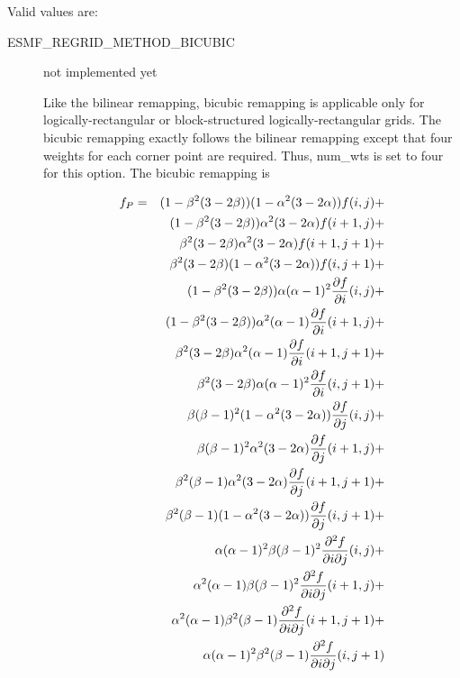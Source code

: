 Valid values are:
\begin{description}
\item[ESMF\_REGRID\_METHOD\_BICUBIC ] not implemented yet

     Like the bilinear remapping, bicubic remapping is applicable
     only for logically-rectangular or block-structured logically-rectangular
     grids.  The bicubic remapping exactly follows the bilinear remapping except
     that four weights for each corner point are required.  Thus, num\_wts
     is set to four for this option.  The bicubic remapping is

\begin{eqnarray}\label{eq:bicubic}
f_P & = & 
    (1 - \beta^2(3-2\beta))(1 - \alpha^2(3-2\alpha))f(i  ,j  ) + \nonumber \\
& & (1 - \beta^2(3-2\beta))     \alpha^2(3-2\alpha) f(i+1,j  ) + \nonumber \\
& &      \beta^2(3-2\beta)      \alpha^2(3-2\alpha) f(i+1,j+1) + \nonumber \\
& &      \beta^2(3-2\beta) (1 - \alpha^2(3-2\alpha))f(i  ,j+1) + \nonumber \\
& & (1 - \beta^2(3-2\beta))\alpha  (\alpha-1)^2 
                        {{\partial f}\over{\partial i}}(i  ,j  ) + \nonumber \\
& & (1 - \beta^2(3-2\beta))\alpha^2(\alpha-1) 
                        {{\partial f}\over{\partial i}}(i+1,j  ) + \nonumber \\
& &      \beta^2(3-2\beta) \alpha^2(\alpha-1)
                        {{\partial f}\over{\partial i}}(i+1,j+1) + \nonumber \\
& &      \beta^2(3-2\beta) \alpha  (\alpha-1)^2 
                        {{\partial f}\over{\partial i}}(i  ,j+1) + \nonumber \\
& & \beta  (\beta-1)^2(1 - \alpha^2(3-2\alpha))
                        {{\partial f}\over{\partial j}}(i  ,j  ) + \nonumber \\
& & \beta  (\beta-1)^2     \alpha^2(3-2\alpha) 
                        {{\partial f}\over{\partial j}}(i+1,j  ) + \nonumber \\
& & \beta^2(\beta-1)       \alpha^2(3-2\alpha)
                        {{\partial f}\over{\partial j}}(i+1,j+1) + \nonumber \\
& & \beta^2(\beta-1)  (1 - \alpha^2(3-2\alpha)) 
                        {{\partial f}\over{\partial j}}(i  ,j+1) + \nonumber \\
& & \alpha  (\alpha-1)^2\beta  (\beta-1)^2
           {{\partial^2 f}\over{\partial i \partial j}}(i  ,j  ) + \nonumber \\
& & \alpha^2(\alpha-1)  \beta  (\beta-1)^2 
           {{\partial^2 f}\over{\partial i \partial j}}(i+1,j  ) + \nonumber \\
& & \alpha^2(\alpha-1)  \beta^2(\beta-1)
           {{\partial^2 f}\over{\partial i \partial j}}(i+1,j+1) + \nonumber \\
& & \alpha  (\alpha-1)^2\beta^2(\beta-1)
           {{\partial^2 f}\over{\partial i \partial j}}(i  ,j+1)
\end{eqnarray}


\end{description}
